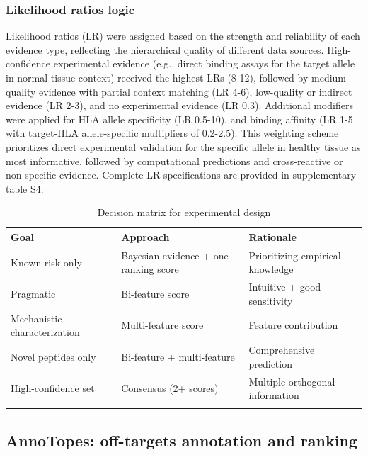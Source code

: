 \documentclass[unnumsec,webpdf,contemporary,large]{oup-authoring-template}%
\theoremstyle{thmstyleone}%
\theoremstyle{thmstyletwo}%
\theoremstyle{thmstylethree}%
\begin{document}
        \subsubsection{Likelihood ratios logic} \label{sec:bayes_LR}
            Likelihood ratios (LR) were assigned based on the strength and reliability of each evidence type, reflecting the hierarchical quality of different data sources. High-confidence experimental evidence (e.g., direct binding assays for the target allele in normal tissue context) received the highest LRs (8-12), followed by medium-quality evidence with partial context matching (LR 4-6), low-quality or indirect evidence (LR 2-3), and no experimental evidence (LR 0.3). Additional modifiers were applied for HLA allele specificity (LR 0.5-10), and binding affinity (LR 1-5 with target-HLA allele-specific multipliers of 0.2-2.5). This weighting scheme prioritizes direct experimental validation for the specific allele in healthy tissue as most informative, followed by computational predictions and cross-reactive or non-specific evidence. Complete LR specifications are provided in supplementary table S4.
    \begin{table}[!htbp]
        \centering
        \caption{Decision matrix for experimental design\label{tab:decisionmatrix}}
        \begin{tabular}{@{}lll@{}}
            \toprule
            Goal & Approach & Rationale \\
            \midrule
            Known risk only & Bayesian evidence + one ranking score & Prioritizing empirical knowledge  \\
            Pragmatic       & Bi-feature score                      & Intuitive + good sensitivity \\
            Mechanistic characterization    & Multi-feature score   & Feature contribution \\
            Novel peptides only & Bi-feature + multi-feature        & Comprehensive prediction \\
            High-confidence set & Consensus (2+ scores)             & Multiple orthogonal information \\
            \botrule
        \end{tabular}
    \end{table}
    
    \subsection{AnnoTopes: off-targets annotation and ranking}\label{sec:annotopes}
\end{document}
